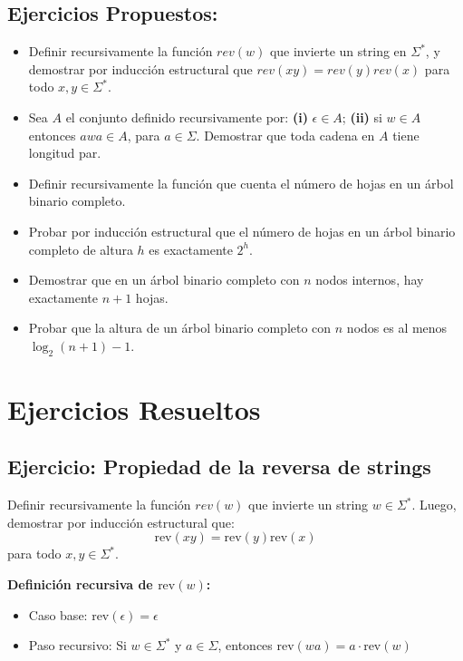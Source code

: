 \subsection{Ejercicios Propuestos:}
\begin{itemize}
     \item Definir recursivamente la función $rev(w)$ que invierte un string en $\Sigma^*$, y demostrar por inducción estructural que $rev(xy) = rev(y)rev(x)$ para todo $x, y \in \Sigma^*$.
    \item Sea $A$ el conjunto definido recursivamente por: \textbf{(i)} $\epsilon \in A$; \textbf{(ii)} si $w \in A$ entonces $awa \in A$, para $a \in \Sigma$. Demostrar que toda cadena en $A$ tiene longitud par.

    \item Definir recursivamente la función que cuenta el número de hojas en un árbol binario completo.
    \item Probar por inducción estructural que el número de hojas en un árbol binario completo de altura $h$ es exactamente $2^h$.
    \item Demostrar que en un árbol binario completo con $n$ nodos internos, hay exactamente $n+1$ hojas.
    \item Probar que la altura de un árbol binario completo con $n$ nodos es al menos $\log_2(n+1) - 1$.
\end{itemize}


\section{Ejercicios Resueltos}

\subsection{Ejercicio: Propiedad de la reversa de strings}

Definir recursivamente la función $rev(w)$ que invierte un string $w \in \Sigma^*$. Luego, demostrar por inducción estructural que:
\[
    \text{rev}(xy) = \text{rev}(y)\text{rev}(x)
\]
para todo $x, y \in \Sigma^*$.

\textbf{Definición recursiva de $\text{rev}(w)$:}
\begin{itemize}
    \item Caso base: $\text{rev}(\epsilon) = \epsilon$
    \item Paso recursivo: Si $w \in \Sigma^*$ y $a \in \Sigma$, entonces $\text{rev}(wa) = a \cdot \text{rev}(w)$
\end{itemize}

